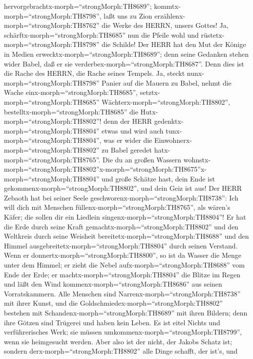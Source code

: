 hervorgebrachtx-morph=``strongMorph:TH8689'';
kommtx-morph=``strongMorph:TH8798'', laßt uns zu Zion
erzählenx-morph=``strongMorph:TH8762'' die Werke des HERRN, unsers
Gottes!  Ja, schärftx-morph=``strongMorph:TH8685'' nun die
Pfeile wohl und rüstetx-morph=``strongMorph:TH8798'' die Schilde! Der
HERR hat den Mut der Könige in Medien
erwecktx-morph=``strongMorph:TH8689''; denn seine Gedanken stehen wider
Babel, daß er sie verderbex-morph=``strongMorph:TH8687''. Denn dies ist
die Rache des HERRN, die Rache seines Tempels.  Ja, steckt
nunx-morph=``strongMorph:TH8798'' Panier auf die Mauern zu Babel, nehmt
die Wache einx-morph=``strongMorph:TH8685'',
setztx-morph=``strongMorph:TH8685''
Wächterx-morph=``strongMorph:TH8802'',
bestelltx-morph=``strongMorph:TH8685'' die
Hutx-morph=``strongMorph:TH8802''! denn der HERR
gedenktx-morph=``strongMorph:TH8804'' etwas und wird auch
tunx-morph=``strongMorph:TH8804'', was er wider die
Einwohnerx-morph=``strongMorph:TH8802'' zu Babel geredet
hatx-morph=``strongMorph:TH8765''.  Die du an großen
Wassern
wohnstx-morph=``strongMorph:TH8802''\textbar x-morph=``strongMorph:TH8675''x-morph=``strongMorph:TH8804''
und große Schätze hast, dein Ende ist
gekommenx-morph=``strongMorph:TH8802'', und dein Geiz ist aus!
 Der HERR Zebaoth hat bei seiner Seele
geschworenx-morph=``strongMorph:TH8738'': Ich will dich mit Menschen
füllenx-morph=``strongMorph:TH8765'', als wären's Käfer; die sollen dir
ein Liedlein singenx-morph=``strongMorph:TH8804''!  Er hat
die Erde durch seine Kraft gemachtx-morph=``strongMorph:TH8802'' und den
Weltkreis durch seine Weisheit bereitetx-morph=``strongMorph:TH8688''
und den Himmel ausgebreitetx-morph=``strongMorph:TH8804'' durch seinen
Verstand.  Wenn er donnertx-morph=``strongMorph:TH8800'',
so ist da Wasser die Menge unter dem Himmel; er zieht die Nebel
aufx-morph=``strongMorph:TH8688'' vom Ende der Erde; er
machtx-morph=``strongMorph:TH8804'' die Blitze im Regen und läßt den
Wind kommenx-morph=``strongMorph:TH8686'' aus seinen Vorratskammern.
 Alle Menschen sind Narrenx-morph=``strongMorph:TH8738''
mit ihrer Kunst, und die Goldschmiedex-morph=``strongMorph:TH8802''
bestehen mit Schandenx-morph=``strongMorph:TH8689'' mit ihren Bildern;
denn ihre Götzen sind Trügerei und haben kein Leben.  Es
ist eitel Nichts und verführerisches Werk; sie müssen
umkommenx-morph=``strongMorph:TH8799'', wenn sie heimgesucht werden.
 Aber also ist der nicht, der Jakobs Schatz ist; sondern
derx-morph=``strongMorph:TH8802'' alle Dinge schafft, der ist's, und
